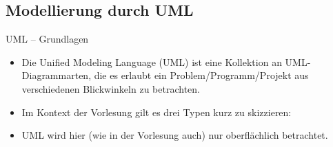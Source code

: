\subsection{Modellierung durch UML}
\begin{frame}{UML -- Grundlagen}
    \begin{itemize}[<+(1)->]
        \widei
        \item Die Unified Modeling Language (UML) ist eine Kollektion an UML-Diagrammarten,\pause{} die es erlaubt ein Problem\thinspace /\thinspace Programm\thinspace /\thinspace Projekt aus verschiedenen Blickwinkeln zu betrachten.
        \item Im Kontext der Vorlesung gilt es drei Typen kurz zu skizzieren: 
        \item UML wird hier (wie in der Vorlesung auch) nur oberflächlich betrachtet.
    \end{itemize}
\end{frame}

